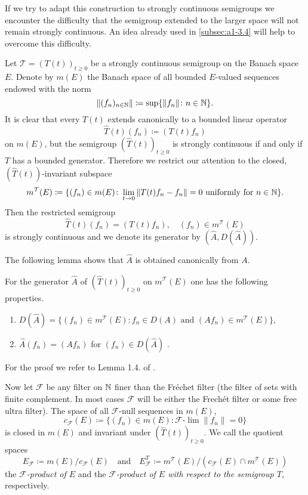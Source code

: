 If we try to adapt this construction to strongly continuous semigroups we encounter the difficulty that the semigroup extended to the larger space will not remain strongly continuous.
An idea already used in \ref{subsec:a1-3.4} will help to overcome this difficulty.

Let $\mathcal{T} = (T(t))_{t \geq 0}$ be a strongly continuous semigroup on the Banach space $E$.
Denote by $m(E)$ the Banach space of all bounded $E$-valued sequences endowed with the norm
\[
    \|(f_{n})_{n \in \mathbb{N}}\| \coloneqq \sup \{\|f_{n}\| \colon n \in \mathbb{N}\} .
\]
It is clear that every $T(t)$ extends canonically to a bounded linear operator
\[
    \hat{T}(t)(f_{n}) \coloneqq (T(t)f_{n})
\]
on $m(E)$, but the semigroup $(\hat{T}(t))_{t \geq 0}$ is strongly continuous if and only if $T$ has a bounded generator.
Therefore we restrict our attention to the closed, $(\hat{T}(t))$-invariant subspace
\[
    m^{\mathcal{T}}(E) \coloneqq \{(f_{n}) \in m(E) \colon \lim_{t \to 0} \|T(t)f_{n}-f_{n}\| = 0 \text{ uniformly for } n \in \mathbb{N}\} .
\]
Then the restricted semigroup
\[
    \hat{T}(t)(f_{n}) = (T(t)f_{n}), \quad (f_{n}) \in m^{\mathcal{T}}(E)
\]
is strongly continuous and we denote its generator by $(\hat{A},D(\hat{A}))$.

The following lemma shows that $\hat{A}$ is obtained canonically from $A$.
\begin{lemma*}\label{lem:a1-3.6}
For the generator $\hat{A}$ of $(\hat{T}(t))_{t \geq 0}$ on $m^{\mathcal{T}}(E)$ one has the following properties.
\begin{enumerate}[\upshape(i)]

\item 
$D(\hat{A}) = \{(f_{n}) \in m^{\mathcal{T}}(E) \colon f_{n} \in D(A) \text{ and } (Af_{n}) \in m^{\mathcal{T}}(E)\}$,

\item 
$\hat{A}(f_{n}) = (Af_{n})$ for $(f_{n}) \in D(\hat{A})$ .
\end{enumerate}

\end{lemma*}
For the proof we refer to Lemma 1.4. of \citet{derndinger:1980}.

Now let $\mathcal{F}$ be any filter on $\mathbb{N}$ finer than the Fréchet filter (\ie the filter of sets with finite complement. In most cases $\mathcal{F}$ will be either the Frechét filter or some free ultra filter).
The space of all $\mathcal{F}$-null sequences in $m(E)$, \ie
\[
    c_{\mathcal{F}}(E) \coloneqq \{(f_{n}) \in m(E) \colon \mathcal{F}\text{-}\lim\|f_{n}\| = 0\}
\]
is closed in $m(E)$ and invariant under $(\hat{T}(t))_{t \geq 0}$. 
We call the quotient spaces
\[
    E_{\mathcal{F}} \coloneqq m(E)/c_{\mathcal{F}}(E) 
    \quad \text{and} \quad 
    E_{\mathcal{F}}^{T} \coloneqq m^{\mathcal{T}}(E)/ (c_{\mathcal{F}}(E)\cap m^{\mathcal{T}}(E))
\]
the \emph{$\mathcal{F}$-product of $E$} and the \emph{$ \mathcal{F} $-product of $E$ with respect to the semigroup $T$}, respectively.

